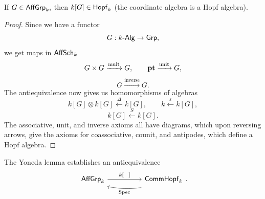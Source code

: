 \begin{lemma}\label{HopfCoordAlg}
    If $G \in {\sf AffGrp}_k,$ then $k[G] \in {\sf Hopf}_k$ (the coordinate algebra is a Hopf algebra).  
\end{lemma}
\begin{proof}
    Since we have a functor
    \[G : k\text{-}{\sf Alg} \to {\sf Grp},\] we get maps in ${\sf AffSch}_k$
    \[G \times G \xrightarrow{\mathrm{mult}} G, \qquad {\bf pt} \xrightarrow{\mathrm{unit}} G,\]
    \[G \xrightarrow{\mathrm{inverse}} G.\]
    The antiequivalence now gives us homomorphisms of algebras
    \[k[G] \otimes k[G] \xleftarrow{\Delta} k [G],\qquad k \xleftarrow{\varepsilon} k[G],\]
    \[k[G] \xleftarrow{S}k[G].\]
    The associative, unit, and inverse axioms all have diagrams, which upon reversing arrows, give the axioms for coassociative, counit, and antipodes, which define a Hopf algebra. 
\end{proof}
\begin{theorem}
    The Yoneda lemma establishes an antiequivalence 
    \[\begin{tikzcd}
	{{\sf AffGrp}_k} && {{\sf CommHopf}_k}
	\arrow["{k[\phantom{X}]}", from=1-1, to=1-3]
	\arrow["{\mathrm{Spec}}", shift left=3, bend left = 8, from=1-3, to=1-1]
\end{tikzcd}.\]
\end{theorem}
